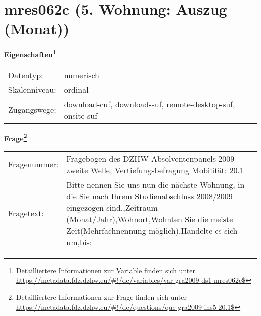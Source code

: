 
    \setcounter{footnote}{0}

    \vspace*{-1.8cm}
	\section{mres062c (5. Wohnung: Auszug (Monat))}
	\label{section:mres062c}



    \vspace*{0.5cm}
    \noindent\textbf{Eigenschaften\footnote{Detailliertere Informationen zur Variable finden sich unter
		\url{https://metadata.fdz.dzhw.eu/\#!/de/variables/var-gra2009-ds1-mres062c$}}}\\
	\begin{tabularx}{\hsize}{@{}lX}
	Datentyp: & numerisch \\
	Skalenniveau: & ordinal \\
	Zugangswege: &
	  download-cuf, 
	  download-suf, 
	  remote-desktop-suf, 
	  onsite-suf
 \\
    \end{tabularx}



				\vspace*{0.5cm}
                \noindent\textbf{Frage\footnote{Detailliertere Informationen zur Frage finden sich unter
		              \url{https://metadata.fdz.dzhw.eu/\#!/de/questions/que-gra2009-ins5-20.1$}}}\\
				\begin{tabularx}{\hsize}{@{}lX}
					Fragenummer: &
					  Fragebogen des DZHW-Absolventenpanels 2009 - zweite Welle, Vertiefungsbefragung Mobilität:
					  20.1
 \\
					Fragetext: & Bitte nennen Sie uns nun die nächste Wohnung, in die Sie nach Ihrem Studienabschluss 2008/2009 eingezogen sind.,Zeitraum (Monat/Jahr),Wohnort,Wohnten Sie die meiste Zeit(Mehrfachnennung möglich),Handelte es sich um,bis: \\
				\end{tabularx}






